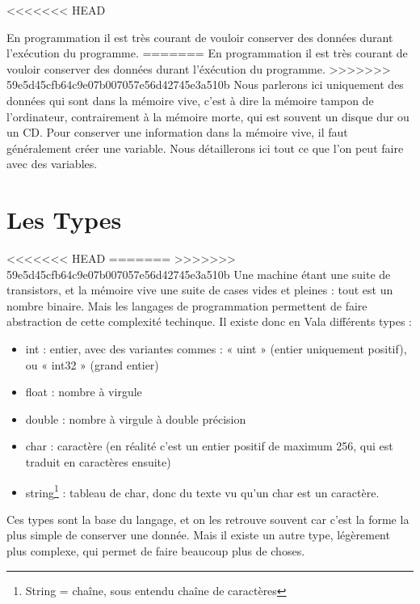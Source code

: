 <<<<<<< HEAD

En programmation il est très courant de vouloir conserver des données durant l'exécution du programme.
=======
En programmation il est très courant de vouloir conserver des données durant l'éxécution du programme.
>>>>>>> 59e5d45cfb64c9e07b007057e56d42745e3a510b
Nous parlerons ici uniquement des données qui sont dans la mémoire vive, c'est à dire la mémoire tampon 
de l'ordinateur, contrairement à la mémoire morte, qui est souvent un disque dur ou un CD.
Pour conserver une information dans la mémoire vive, il faut généralement créer une variable. Nous détaillerons 
ici tout ce que l'on peut faire avec des variables.

\section{Les Types}
<<<<<<< HEAD
\label{DefTypes}
=======
>>>>>>> 59e5d45cfb64c9e07b007057e56d42745e3a510b
Une machine étant une suite de transistors, et la mémoire vive une suite de cases vides et pleines :
tout est un nombre binaire. Mais les langages de programmation permettent de faire abstraction de cette complexité techinque.
Il existe donc en Vala différents types : 
\begin{itemize}
  \item int : entier, avec des variantes commes : « uint » (entier uniquement positif), ou « int32 » (grand entier)
  \item float : nombre à virgule 
  \item double : nombre à virgule à double précision
  \item char : caractère (en réalité c'est un entier positif de maximum 256, qui est traduit en caractères ensuite)
  \item string\footnote{String = chaîne, sous entendu chaîne de caractères} : tableau de char, donc du texte vu qu'un char est un caractère.
\end{itemize}

Ces types sont la base du langage, et on les retrouve souvent car c'est la forme la plus simple de conserver une donnée.
Mais il existe un autre type, légèrement plus complexe, qui permet de faire beaucoup plus de choses.

